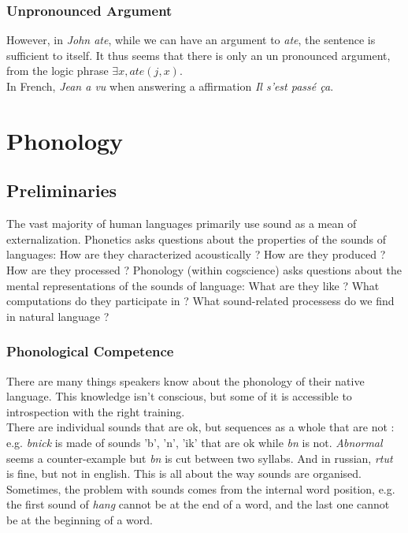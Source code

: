 \documentclass{cours}
\begin{document}
\subsubsection{Unpronounced Argument}
However, in \textsl{John ate}, while we can have an argument to \textsl{ate}, the sentence is sufficient to itself.
It thus seems that there is only an un pronounced argument, from the logic phrase $\exists x, ate(j, x)$. \\
In French, \textsl{Jean a vu} when answering a affirmation \textsl{Il s'est passé ça}. \\


\section[Class 7\! : 23/11]{Phonology}
\subsection{Preliminaries}
The vast majority of human languages primarily use sound as a mean of externalization. Phonetics asks questions about the properties of the sounds of languages\!: How are they characterized acoustically ? How are they produced ? How are they processed ? Phonology (within cogscience) asks questions about the mental representations of the sounds of language\!: What are they like ? What computations do they participate in ? What sound-related processess do we find in natural language ?

\subsubsection{Phonological Competence}
There are many things speakers know about the phonology of their native language. This knowledge isn't conscious, but some of it is accessible to introspection with the right training.\\
There are individual sounds that are ok, but sequences as a whole that are not\! : e.g. \textsl{bnick} is made of sounds 'b', 'n', 'ik' that are ok while \textsl{bn} is not. \textsl{Abnormal} seems a counter-example but \textsl{bn} is cut between two syllabs. And in russian, \textsl{rtut} is fine, but not in english. This is all about the way sounds are organised. \\
Sometimes, the problem with sounds comes from the internal word position, e.g. the first sound of \textsl{hang} cannot be at the end of a word, and the last one cannot be at the beginning of a word.
\end{document}

